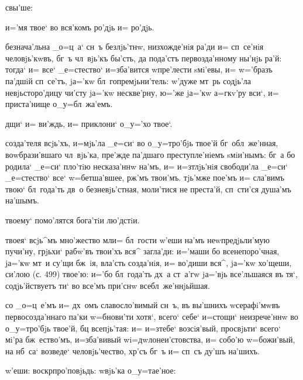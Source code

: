 
  свы'ше:

  и='мя твое` во вся'комъ ро'дjь и= 
ро'дjь.

 безнача'льна _о=ц~а` сн~ъ безлjь'тнw, 
низхожде'нiя ра'ди и= сп~се'нiя человjь'кwвъ, бг~ъ 
чл~вjь'къ бы'сть, да пода'стъ первозда'нному ны'нjь ра'й: 
тогда` и= все` _е=стество` и=зба'вится w\т пре'лести 
sмi'евы, и= w='бразъ па'дшiй сп~се'тъ, jа='кw 
бл~гопремjьни'тель: w'дуже мт~рь содjь'ла 
невjьсторо'дицу чи'сту jа='кw нескве'рну, ю='же jа='кw 
а=гкv'ру вси`, и= приста'нище о_у=бл~жа'емъ.

  дщи` и= ви'ждь, и= приклони` 
о_у='хо твое`.

 созда'теля всjь'хъ, и=мjь'ла _е=си` во 
о_у=тро'бjь твое'й бг~обл~же'нная, воwбрази'вшаго 
чл~вjь'ка, пре'жде па'дшаго преступле'нiемъ sмiи'нымъ: 
бг~а бо родила` _е=си` пло'тiю несказа'ннw на'мъ, и= 
и=з\ъ тлjь'нiя свободи'ла _е=си` _е=стество` все` 
w=бетша'вшее, рж'мъ твои'мъ. тjь'мже пое'мъ и= 
сла'вимъ твою` бл~года'ть дв~о безневjь'стная, моли'тися 
не преста'й, сп~сти'ся душа'мъ на'шымъ.

  твоему` помо'лятся бога'тiи 
лю'дстiи.

 твоея` всjь^мъ мно'жество мл и= бл~гости 
w'еши на'мъ неwпредjьли'мую пучи'ну, грjьхи` рабw'въ 
твои'хъ вся^ загла'ди: и='маши бо всенепоро'чная, jа='кw 
мт~и су'щи бж~iя, вла'сть созда'нiя, и= во'диши вся^, 
jа='кw хо'щеши, си'лою (с. 499) твое'ю: и='бо бл~года'ть 
дх~а ст~а'гw jа='вjь все'льшаяся въ тя`, содjь'йствуетъ 
ти` во все'мъ при'снw всебл~же'ннjьйшая.

    со _о=ц~е'мъ и= дх~омъ 
славосло'вимый сн~ъ, въ вы'шнихъ w\т серафi'мwвъ 
первосозда'ннаго па'ки w=бнови'ти хотя`, всего` себе` 
и=стощи` неизрече'ннw во о_у=тро'бjь твое'й, бц 
всепjь'тая: и= и=з\ъ тебе` возсiя'вый, просвjьти` всего` 
мi'ра бж~ество'мъ, и=зба'вивый w\т i=дwлонеи'стовства, и= 
собо'ю w=божи'вый, на нб~са` возведе` человjь'чество, 
хр'съ бг~ъ и= сп~съ ду'шъ на'шихъ.

  w'еши:    воскр про'повjьдь:   w\т вjь'ка о_у=тае'ное: 
